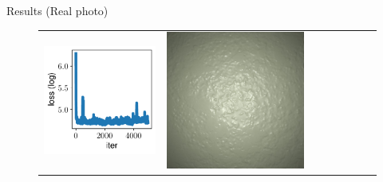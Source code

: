 \documentclass[final]{beamer}
\newlength{\twocolwid}
\newlength{\resultwidth}
\begin{document}
\begin{frame}[t]
\begin{columns}[t]
\begin{column}{\twocolwid}
\begin{block}{Results (Real photo)}
\begin{figure}[t]
\begin{tabular}{ccrclccc}
            		\includegraphics[width=\resultwidth]{images/real/plaster/loss.pdf} &
            		\includegraphics[width=\resultwidth]{images/real/plaster/optim.jpg} &

\end{tabular}
\end{figure}
\end{block}
\end{column}
\end{columns}
\end{frame}
\end{document}
